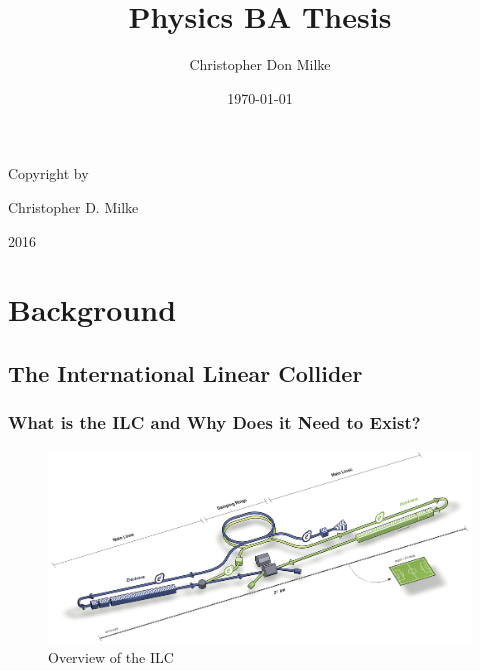 \documentclass{report}
\title{Physics BA Thesis}
\author{Christopher Don Milke}
\date{\today}
\begin{document}
	\begin{titlepage}
        \maketitle
	\end{titlepage}

    \newpage
    \begin{center}
        \vspace*{\fill}
        Copyright \textcopyright by

        Christopher D. Milke 

        2016
        \vspace*{\fill}
    \end{center}
    \newpage

    \tableofcontents

    \chapter{ Background }
        \section{ The International Linear Collider }
            \subsection{ What is the ILC and Why Does it Need to Exist? }
                \begin{figure}[h] 
                    \includegraphics[width=\textwidth]{ilcoverview}
                    \centering
                    \caption{Overview of the ILC}
                    \label{fig:ilcoverview}
                \end{figure}
\end{document}

